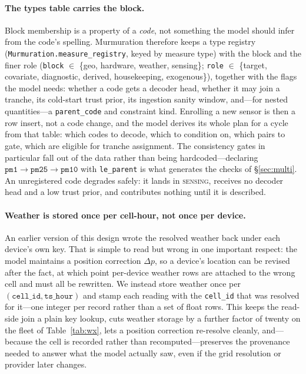 \documentclass[10pt]{article}
\begin{document}
\paragraph{The types table carries the block.}
Block membership is a property of a \emph{code}, not something the model should
infer from the code's spelling. Murmuration therefore keeps a type registry
(\texttt{Murmuration.measure\_registry}, keyed by measure type) with the block and the finer role
(\texttt{block} $\in$ \{geo, hardware, weather, sensing\}; \texttt{role} $\in$
\{target, covariate, diagnostic, derived, housekeeping, exogenous\}), together with
the flags the model needs: whether a code gets a decoder head, whether it may join
a tranche, its cold-start trust prior, its ingestion sanity window, and---for
nested quantities---a \texttt{parent\_code} and constraint kind. Enrolling a new
sensor is then a row insert, not a code change, and the model derives its whole
plan for a cycle from that table: which codes to decode, which to condition on,
which pairs to gate, which are eligible for tranche assignment. The consistency
gates in particular fall out of the data rather than being hardcoded---declaring
$\texttt{pm1}\rightarrow\texttt{pm25}\rightarrow\texttt{pm10}$ with
\texttt{le\_parent} is what generates the checks of \S\ref{sec:multi}. An
unregistered code degrades safely: it lands in \textsc{sensing}, receives no
decoder head and a low trust prior, and contributes nothing until it is described.

\paragraph{Weather is stored once per cell-hour, not once per device.}
An earlier version of this design wrote the resolved weather back under each
device's own key. That is simple to read but wrong in one important respect: the
model maintains a position correction $\Delta p$, so a device's location can be
revised after the fact, at which point per-device weather rows are attached to the
wrong cell and must all be rewritten. We instead store weather once per
$(\texttt{cell\_id}, \texttt{ts\_hour})$ and stamp each reading with the
\texttt{cell\_id} that was resolved for it---one integer per record rather than a
set of float rows. This keeps the read-side join a plain key lookup, cuts weather
storage by a further factor of twenty on the fleet of Table~\ref{tab:wx}, lets a
position correction re-resolve cleanly, and---because the cell is recorded rather
than recomputed---preserves the provenance needed to answer what the model actually
saw, even if the grid resolution or provider later changes.
\end{document}
